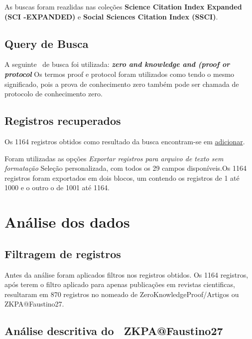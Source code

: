 
As buscas foram reazlidas nas coleções \textbf{Science  Citation  Index  Expanded (SCI -EXPANDED)} e \textbf{Social  Sciences  Citation  Index (SSCI)}.

\subsection{Query de Busca}
A seguinte \querry\ de busca foi utilizada:
\textit{\textbf{zero and knowledge and (proof or protocol}}
Os termos proof e protocol foram utilizados como tendo o mesmo significado, pois a prova de conhecimento zero também pode ser chamada de protocolo de conhecimento zero.

\subsection{Registros recuperados}

Os 1164 registros obtidos como resultado da busca encontram-se em \url{adicionar}.

Foram utilizadas as opções \textit{Exportar registros para arquivo de texto sem formatação} Seleção personalizada, com todos os 29 campos disponíveis.Os 1164 registros foram exportados em dois blocos, um contendo os registros de 1 até 1000 e o outro o de 1001 até 1164.

\section{Análise dos dados}

\subsection{Filtragem de registros}

Antes da análise foram aplicados filtros nos registros obtidos. Os 1164 registros, após terem o filtro aplicado para apenas publicações em revistas cientificas, resultaram em 870 registros no \dataset nomeado de ZeroKnowledgeProof/Artigos ou ZKPA@Faustino27.

\subsection{Análise descritiva do \dataset\   ZKPA@Faustino27}

